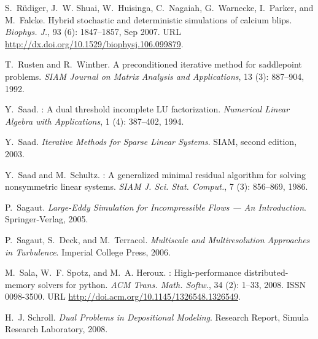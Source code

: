 \begin{thebibliography}{467}
S.~R\"udiger, J.~W. Shuai, W.~Huisinga, C.~Nagaiah, G.~Warnecke, I.~Parker, and
  M.~Falcke.
\newblock Hybrid stochastic and deterministic simulations of calcium blips.
\newblock \emph{Biophys. J.}, 93 (6): 1847--1857, Sep 2007.
\newblock URL \url{http://dx.doi.org/10.1529/biophysj.106.099879}.

T.~Rusten and R.~Winther.
\newblock A preconditioned iterative method for saddlepoint problems.
\newblock \emph{SIAM Journal on Matrix Analysis and Applications}, 13
  (3): 887--904, 1992.

Y.~Saad.
: {A} dual threshold incomplete {LU} factorization.
\newblock \emph{Numerical Linear Algebra with Applications}, 1
  (4): 387--402, 1994.

Y.~Saad.
\newblock \emph{Iterative Methods for Sparse Linear Systems}.
\newblock SIAM, second edition, 2003.

Y.~Saad and M.~Schultz.
: A generalized minimal residual algorithm for solving
  nonsymmetric linear systems.
\newblock \emph{SIAM J. Sci. Stat. Comput.}, 7 (3): 856--869,
  1986.

P.~Sagaut.
\newblock \emph{Large-Eddy Simulation for Incompressible Flows --- An
  Introduction}.
\newblock Springer-Verlag, 2005.

P.~Sagaut, S.~Deck, and M.~Terracol.
\newblock \emph{Multiscale and Multiresolution Approaches in Turbulence}.
\newblock Imperial College Press, 2006.

M.~Sala, W.~F. Spotz, and M.~A. Heroux.
: {H}igh-performance distributed-memory solvers for
  python.
\newblock \emph{ACM Trans. Math. Softw.}, 34 (2): 1--33,
  2008.
\newblock ISSN 0098-3500.
\newblock URL \url{http://doi.acm.org/10.1145/1326548.1326549}.

H.~J. Schroll.
\newblock \emph{Dual Problems in Depositional Modeling}.
\newblock Research Report, Simula Research Laboratory, 2008.


\end{thebibliography}
